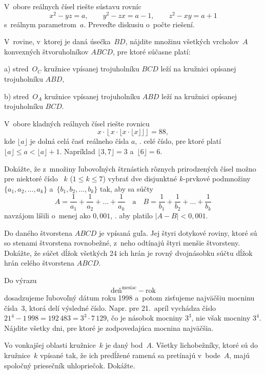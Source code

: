 {%
V~obore reálnych čísel riešte sústavu rovníc
$$
x^2-yz=a, \qquad
y^2-zx=a-1, \qquad
z^2-xy=a+1
$$
s~reálnym parametrom~$a$. Preveďte diskusiu o~počte riešení.
}

{%
V~rovine, v~ktorej je daná úsečka~$BD$, nájdite množinu všetkých
vrcholov~$A$ konvexných štvoruholníkov $ABCD$, pre ktoré súčasne
platí:
\item{a)} stred~$O_C$ kružnice vpísanej trojuholníku $BCD$ leží na kružnici
opísanej trojuholníku $ABD$,
\item{b)} stred~$O_A$ kružnice vpísanej trojuholníku $ABD$ leží na kružnici
opísanej trojuholníku $BCD$.
}

{%
V~obore kladných reálnych čísel riešte rovnicu
$$
x\cdot\left\lfloor x\cdot\bigl\lfloor x\cdot\lfloor x\rfloor\bigr\rfloor\right\rfloor=88,
$$
kde $\lfloor a\rfloor$ je dolná celá časť reálneho čísla $a$, \tj. celé číslo,
pre ktoré platí $\lfloor a\rfloor\le a<\lfloor a\rfloor+1$. Napríklad $\lfloor3{,}7\rfloor=3$
a~$\lfloor6\rfloor=6$.}

{%
Dokážte, že z~množiny ľubovoľných štrnástich rôznych prirodzených čísel
možno
pre niektoré číslo~ $k$ ($1\le k\le7$) vybrať dve disjunktné $k$-prvkové
podmnožiny $\{a_1,a_2,\dots,a_k\}$ a~$\{b_1,b_2,\dots,b_k\}$
tak, aby sa súčty
$$
A=\frac1{a_1}+\frac1{a_2}+\dots+\frac1{a_k}\quad\text{a}\quad
B=\frac1{b_1}+\frac1{b_2}+\dots+\frac1{b_k}
$$
navzájom líšili o~menej ako $0{,}001$, \tj. aby platilo
$|A-B|<0{,}001$.
}

{%
Do daného štvorstena $ABCD$ je vpísaná guľa. Jej štyri dotykové
roviny, ktoré sú so stenami štvorstena rovnobežné,
z~neho odtínajú štyri menšie štvorsteny. Dokážte, že súčet dĺžok
všetkých 24 ich hrán je rovný dvojnásobku súčtu dĺžok hrán celého
štvorstena $ABCD$.}

{%
Do výrazu
$$
\text{deň}^{\text{mesiac}}-\text{rok}
$$
dosadzujeme
ľubovoľný dátum roku 1998 a~potom zisťujeme najväčšiu
mocninu čísla~$3$, ktorá delí výsledné číslo. Napr. pre 21.~apríl
vychádza číslo $21^4-1\,998=192\,483=3^3\cdot7\,129$, čo je násobok
mocniny $3^3$, nie však mocniny $3^4$. Nájdite všetky dni, pre
ktoré je zodpovedajúca mocnina najväčšia.}

{%
Vo vonkajšej oblasti kružnice~$k$ je daný bod~$A$. Všetky
lichobežníky, ktoré sú do kružnice~$k$ vpísané tak, že ich
predĺžené ramená sa pretínajú v~bode~$A$, majú spoločný
priesečník uhlopriečok. Dokážte.}

